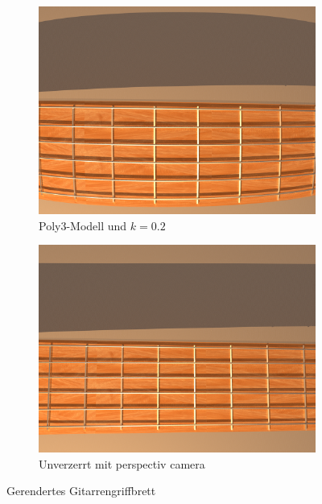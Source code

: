 \begin{figure}[h]
	\begin{subfigure}{.5\textwidth}
		\raggedleft
		\includegraphics[width=\textwidth]{img/guitarDistorted.png}
		\caption{Poly3-Modell und $k=0.2$}
	\end{subfigure}
\begin{subfigure}{.5\textwidth}
		\raggedright
		\includegraphics[width=\textwidth, ]{img/guitarUndist.png}
		\caption{Unverzerrt mit perspectiv camera}
	\end{subfigure}
\caption{Gerendertes Gitarrengriffbrett}
\label{fig:Guitar}
\end{figure}


